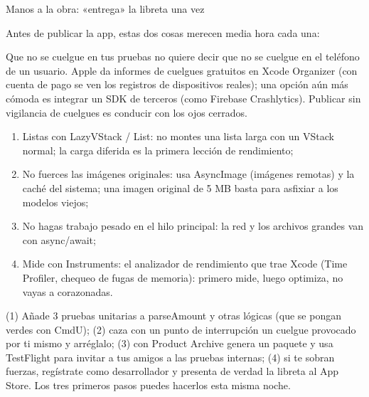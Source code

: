 \begin{tcbpractice}{Manos a la obra: «entrega» la libreta una vez}

Antes de publicar la app, estas dos cosas merecen media hora cada una:


Que no se cuelgue en tus pruebas no quiere decir que no se cuelgue en el teléfono de un usuario. Apple da informes de cuelgues gratuitos en Xcode Organizer (con cuenta de pago se ven los registros de dispositivos reales); una opción aún más cómoda es integrar un SDK de terceros (como Firebase Crashlytics). Publicar sin vigilancia de cuelgues es conducir con los ojos cerrados.


\begin{enumerate}
  \item Listas con LazyVStack / List: no montes una lista larga con un VStack normal; la carga diferida es la primera lección de rendimiento;
  \item No fuerces las imágenes originales: usa AsyncImage (imágenes remotas) y la caché del sistema; una imagen original de 5 MB basta para asfixiar a los modelos viejos;
  \item No hagas trabajo pesado en el hilo principal: la red y los archivos grandes van con async/await;
  \item Mide con Instruments: el analizador de rendimiento que trae Xcode (Time Profiler, chequeo de fugas de memoria): primero mide, luego optimiza, no vayas a corazonadas.
\end{enumerate}

(1) Añade 3 pruebas unitarias a parseAmount y otras lógicas (que se pongan verdes con CmdU); (2) caza con un punto de interrupción un cuelgue provocado por ti mismo y arréglalo; (3) con Product Archive genera un paquete y usa TestFlight para invitar a tus amigos a las pruebas internas; (4) si te sobran fuerzas, regístrate como desarrollador y presenta de verdad la libreta al App Store. Los tres primeros pasos puedes hacerlos esta misma noche.

\end{tcbpractice}

